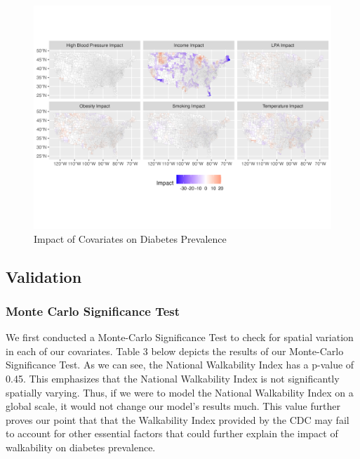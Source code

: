 \documentclass[
]{article}
\begin{document}
\begin{figure}[H]

{\centering \includegraphics{facet_plot.png}

}

\caption{Impact of Covariates on Diabetes Prevalence}

\end{figure}%

\subsection{Validation}\label{validation-1}

\subsubsection{Monte Carlo Significance
Test}\label{monte-carlo-significance-test}

We first conducted a Monte-Carlo Significance Test to check for spatial
variation in each of our covariates. Table 3 below depicts the results
of our Monte-Carlo Significance Test. As we can see, the National
Walkability Index has a p-value of 0.45. This emphasizes that the
National Walkability Index is not significantly spatially varying. Thus,
if we were to model the National Walkability Index on a global scale, it
would not change our model's results much. This value further proves our
point that that the Walkability Index provided by the CDC may fail to
account for other essential factors that could further explain the
impact of walkability on diabetes prevalence.
\end{document}
